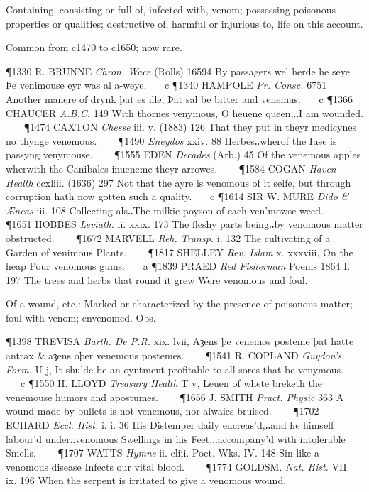 \begin{description}[wide, labelwidth=!, labelindent=0pt]
\begin{myenumerate}
 Containing, consisting or full of, infected with, venom; possessing poisonous properties or qualities; destructive of, harmful or injurious to, life on this account.

Common from c1470 to c1650; now rare.

\P 1330 R. BRUNNE  \textit{Chron. Wace} (Rolls) 16594 By passagers wel herde he seye Þe venimouse eyr was al a-weye.    c 
\P 1340 HAMPOLE  \textit{Pr. Consc.} 6751 Another manere of drynk þat es ille, Þat sal be bitter and venemus.    c 
\P 1366 CHAUCER  \textit{A.B.C.} 149 With thornes venymous, O heuene queen,‥I am wounded.    
\P 1474 CAXTON  \textit{Chesse} iii. v. (1883) 126 That they put in theyr medicynes no thynge venemous.    
\P 1490 \textit{Eneydos} xxiv. 88 Herbes‥wherof the Iuse is passyng venymouse.    
\P 1555 EDEN  \textit{Decades} (Arb.) 45 Of the venemous apples wherwith the Canibales inueneme theyr arrowes.    
\P 1584 COGAN  \textit{Haven Health} ccxliii. (1636) 297 Not that the ayre is venomous of it selfe, but through corruption hath now gotten such a quality.    c 
\P 1614 SIR W. MURE  \textit{Dido \& Æneas} iii. 108 Collecting als‥The milkie poyson of each ven'mowse weed.    
\P 1651 HOBBES  \textit{Leviath.} ii. xxix. 173 The fleshy parts being‥by venomous matter obstructed.    
\P 1672 MARVELL  \textit{Reh. Transp.} i. 132 The cultivating of a Garden of venimous Plants.    
\P 1817 SHELLEY  \textit{Rev. Islam} x. xxxviii, On the heap Pour venomous gums.    a 
\P 1839 PRAED  \textit{Red Fisherman} Poems 1864 I. 197  The trees and herbs that round it grew Were venomous and foul.

 Of a wound, etc.: Marked or characterized by the presence of poisonous matter; foul with venom; envenomed. Obs.

\P 1398 TREVISA  \textit{Barth. De P.R.} xix. lvii, Aȝens þe venemos posteme þat hatte antrax \& aȝens oþer venemous postemes.    
\P 1541 R. COPLAND  \textit{Guydon's Form.} U j, It shulde be an oyntment profitable to all sores that be venymous.    c 
\P 1550 H. LLOYD  \textit{Treasury Health} T v, Leuen of whete breketh the venemouse humors and apostumes.    
\P 1656 J. SMITH  \textit{Pract. Physic} 363 A wound made by bullets is not venemous, nor alwaies bruised.    
\P 1702 ECHARD  \textit{Eccl. Hist.} i. i. 36 His Distemper daily encreas'd,‥and he himself labour'd under‥venomous Swellings in his Feet,‥accompany'd with intolerable Smells.    
\P 1707 WATTS  \textit{Hymns} ii. cliii. Poet. Wks. IV. 148 Sin like a venomous disease Infects our vital blood.    
\P 1774 GOLDSM.  \textit{Nat. Hist.} VII. ix. 196 When the serpent is irritated to give a venomous wound.


\end{myenumerate}
\end{description}

